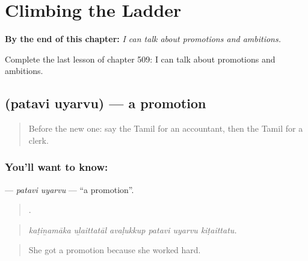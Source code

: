 
\chapter{Climbing the Ladder}
\label{ch:ta-climbing-the-ladder}

\begin{chapteropening}
\textbf{By the end of this chapter:} \emph{I can talk about promotions and ambitions.}

Complete the last lesson of chapter 509: I can talk about promotions and ambitions.
\end{chapteropening}

\section[\texorpdfstring{\ta{பதவி} \ta{உயர்வு} (patavi uyarvu)}{பதவி உயர்வு (patavi uyarvu)}]{  (patavi uyarvu) — a promotion}

\label{lesson:TA-C509-patavi-uyarvu}



\begin{quote}
Before the new one: say the Tamil for an accountant, then the Tamil for a clerk.
\end{quote}

\subsection*{You'll want to know:  }
\textbf{ } — \emph{patavi uyarvu} — \textquotedblleft{}a promotion\textquotedblright{}.

\begin{quote}
     .
\end{quote}

\begin{quote}
\emph{kaṭiṉamāka uḻaittatāl avaḷukkup patavi uyarvu kiṭaittatu.}
\end{quote}

\begin{quote}
She got a promotion because she worked hard.
\end{quote}

